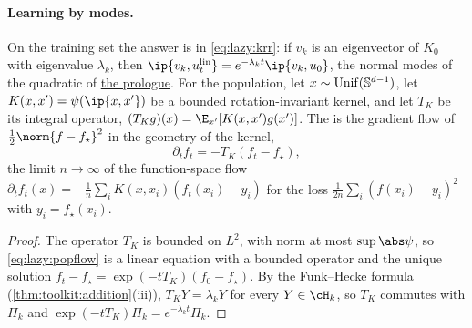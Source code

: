 \begin{refsection}
\paragraph{Learning by modes.} On the training set the answer is in \eqref{eq:lazy:krr}: if $v_k$ is an eigenvector of $K_0$ with eigenvalue $\lambda_k$, then $\ip{v_k,u^{\mathrm{lin}}_t}=e^{-\lambda_kt}\ip{v_k,u_0}$, the normal modes of the quadratic of \hyperref[ch:prologue]{the prologue}. For the population, let $x\sim\operatorname{Unif}(\mathbb{S}^{d-1})$, let $K(x,x')=\psi(\ip{x,x'})$ be a bounded rotation-invariant kernel, and let $T_K$ be its integral operator, $(T_Kg)(x)=\E_{x'}[K(x,x')g(x')]$. The  is the gradient flow of $\frac12\norm{f-f_\star}^2$ in the geometry of the kernel,
\begin{equation}\label{eq:lazy:popflow}
  \partial_tf_t=-T_K(f_t-f_\star),
\end{equation}
the limit $n\to\infty$ of the function-space flow $\partial_tf_t(x)=-\frac1n\sum_iK(x,x_i)(f_t(x_i)-y_i)$ for the loss $\frac1{2n}\sum_i(f(x_i)-y_i)^2$ with $y_i=f_\star(x_i)$.


\begin{proof}
The operator $T_K$ is bounded on $L^2$, with norm at most $\sup\abs\psi$, so \eqref{eq:lazy:popflow} is a linear equation with a bounded operator and the unique solution $f_t-f_\star=\exp(-tT_K)(f_0-f_\star)$. By the Funk--Hecke formula (\cref{thm:toolkit:addition}(iii)), $T_KY=\lambda_kY$ for every $Y\in\cH_k$, so $T_K$ commutes with $\Pi_k$ and $\exp(-tT_K)\Pi_k=e^{-\lambda_kt}\Pi_k$.
\end{proof}


\end{refsection}
